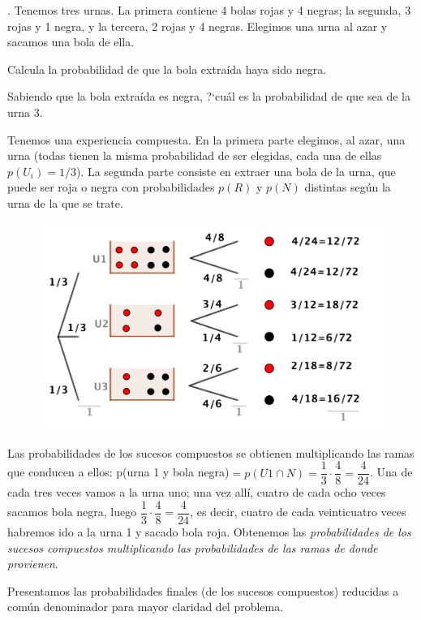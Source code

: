 \begin{example}
	. Tenemos tres urnas. La primera contiene 4 bolas rojas y 4 negras; la segunda, 3 rojas y 1 negra, y la tercera, 2 rojas y 4 negras. Elegimos una urna al azar y sacamos una bola de ella.
	
	Calcula la probabilidad de que la bola extraída haya sido negra.
	
	Sabiendo que la bola extraída es negra, ?`cuál es la probabilidad de que sea de la urna 3.
	
	\vspace{4mm} Tenemos una experiencia compuesta. En la primera parte elegimos, al azar, una urna (todas tienen la misma probabilidad de ser elegidas, cada una de ellas $p(U_i)=1/3$). La segunda parte consiste en extraer una bola de la urna, que puede ser roja o negra con probabilidades $p(R)$ y $p(N)$ distintas según la urna de la que se trate.

	\begin{figure}[H]
			\centering
			\includegraphics[width=.75\textwidth]{imagenes/imagenes02/T02IM23.png}
	\end{figure}	
	
Las probabilidades de los sucesos compuestos se obtienen multiplicando las ramas que conducen a ellos: p(urna 1 y bola negra)$=p(U1 \cap N)=\dfrac 1 3 \cdot \dfrac 4 8 = \dfrac 4  {24}$. Una de cada tres veces vamos a la urna uno; una vez allí, cuatro de cada ocho veces sacamos bola negra, luego  $\dfrac 1 3 \cdot \dfrac 4 8 = \dfrac 4 {24}$, es decir, cuatro de cada veinticuatro veces habremos ido a la urna 1 y sacado bola roja.  Obtenemos las \emph{probabilidades de los sucesos compuestos multiplicando las probabilidades de las ramas de donde provienen}.

\vspace{2mm} Presentamos las probabilidades finales (de los sucesos compuestos) reducidas a común denominador para mayor claridad del problema.


\end{example}
